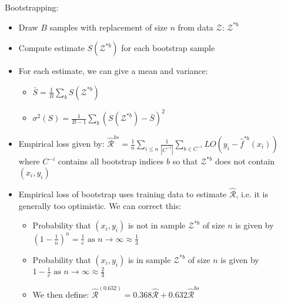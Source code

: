 Bootstrapping:
\begin{itemize}
    \item Draw $B$ samples with replacement of size $n$ from data $\mathcal{Z}$: $\mathcal{Z}^{*b}$
    \item Compute estimate $S( \mathcal{Z}^{*b} )$ for each bootstrap sample
    \item For each estimate, we can give a mean and variance:
    \begin{itemize}
        \item $\bar{S} = \frac{1}{B} \sum_b S( \mathcal{Z}^{*b} )$
        \item $\sigma^2(S) = \frac{1}{B-1} \sum_b ( S( \mathcal{Z}^{*b} ) - \bar{S})^2$
    \end{itemize}
    \item Empirical loss given by: $\hat{\mathcal{R}}^{bs} = \frac{1}{n} \sum_{i\leq n} \frac{1}{| C^{-i} |} \sum_{b \in C^{-i}} LO(y_i - \hat{f}^{*b} (x_i))$ where $C^{-i}$ contains all bootstrap indices $b$ so that $\mathcal{Z}^{*b}$ does not contain $(x_i,y_i)$
    \item Empirical loss of bootstrap uses training data to estimate $\hat{\mathcal{R}}$, i.e. it is generally too optimistic. We can correct this:
    \begin{itemize}
        \item Probability that $(x_i,y_i)$ is not in sample $\mathcal{Z}^{*b}$ of size $n$ is given by $(1-\frac{1}{n})^n = \frac{1}{e} \textrm{ as } n \rightarrow \infty \approx \frac{1}{3}$
        \item Probability that $(x_i,y_i)$ is in sample $\mathcal{Z}^{*b}$ of size $n$ is given by $1 - \frac{1}{e} \textrm{ as } n \rightarrow \infty \approx \frac{2}{3}$
        \item We then define: $\hat{\mathcal{R}}^{(0.632)} = 0.368 \hat{\mathcal{R}} + 0.632 \hat{\mathcal{R}}^{bs}$
    \end{itemize}
\end{itemize}